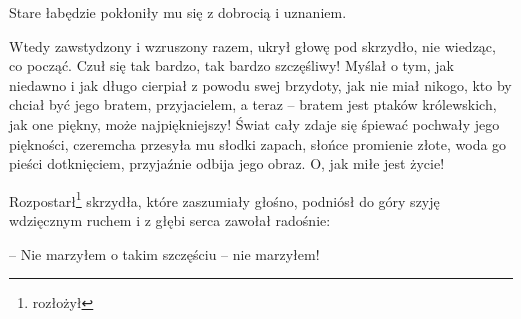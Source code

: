 \documentclass{book}
\begin{document}
Stare łabędzie pokłoniły mu się z dobrocią i uznaniem.

Wtedy zawstydzony i wzruszony razem, ukrył głowę pod skrzydło, nie wiedząc, co począć. Czuł się tak bardzo, tak bardzo szczęśliwy! Myślał o tym, jak niedawno i jak długo cierpiał z powodu swej brzydoty, jak nie miał nikogo, kto by chciał być jego bratem, przyjacielem, a teraz -- bratem jest ptaków królewskich, jak one piękny, może najpiękniejszy! Świat cały zdaje się śpiewać pochwały jego piękności, czeremcha przesyła mu słodki zapach, słońce promienie złote, woda go pieści dotknięciem, przyjaźnie odbija jego obraz. O, jak miłe jest życie!

Rozpostarł\footnote{rozłożył} skrzydła, które zaszumiały głośno, podniósł do góry szyję wdzięcznym ruchem i z głębi serca zawołał radośnie:

-- Nie marzyłem o takim szczęściu -- nie marzyłem!
\backmatter
\printindex
\end{document}
